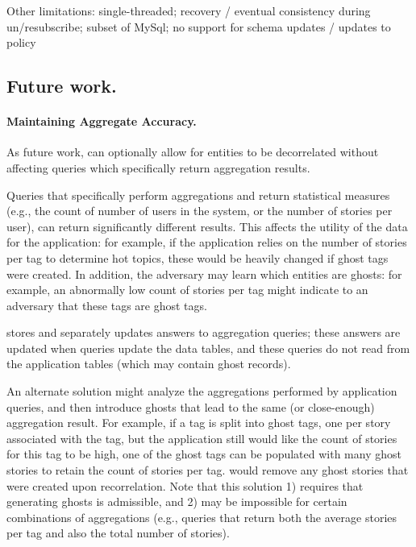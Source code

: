 Other limitations: 
single-threaded;
recovery / eventual consistency during un/resubscribe;
subset of MySql;
no support for schema updates / updates to policy

\subsection{Future work.}
\paragraph{Maintaining Aggregate Accuracy.}
As future work, \sys{} can optionally allow for entities to be decorrelated without affecting queries which
specifically return aggregation results.

Queries that specifically perform aggregations and return statistical measures (e.g.,
the count of number of users in the system, or the number of stories per user), can return
significantly different results. This affects the utility of the data for the application: for
example, if the application relies on the number of stories per tag to determine hot topics, these
would be heavily changed if ghost tags were created.  In addition, the adversary may learn which
entities are ghosts: for example, an abnormally low count of stories per tag might indicate to an
adversary that these tags are ghost tags.  

\sys{} stores and separately updates answers to aggregation queries;
these answers are updated when queries update the data tables, and these queries do not read from
the application tables (which may contain ghost records).

An alternate solution might analyze the aggregations performed by application queries, and then
introduce ghosts that lead to the same (or close-enough) aggregation result. For example, if a tag
is split into ghost tags, one per story associated with the tag, but the application still would
like the count of stories for this tag to be high, one of the ghost tags can be populated with many
ghost stories to retain the count of stories per tag.  \sys{} would remove any ghost stories that
were created upon recorrelation. Note that this solution 1) requires that generating ghosts is
admissible, and 2) may be impossible for certain combinations of aggregations (e.g., queries that
return both the average stories per tag and also the total number of stories).


\fi
